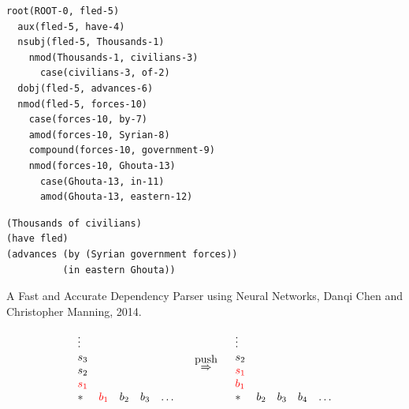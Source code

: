 {\begin{verbatim}
root(ROOT-0, fled-5)
  aux(fled-5, have-4)
  nsubj(fled-5, Thousands-1)
    nmod(Thousands-1, civilians-3)
      case(civilians-3, of-2)
  dobj(fled-5, advances-6)
  nmod(fled-5, forces-10)
    case(forces-10, by-7)
    amod(forces-10, Syrian-8)
    compound(forces-10, government-9)
    nmod(forces-10, Ghouta-13)
      case(Ghouta-13, in-11)
      amod(Ghouta-13, eastern-12)
\end{verbatim}


\begin{verbatim}
(Thousands of civilians)
(have fled)
(advances (by (Syrian government forces))
          (in eastern Ghouta))
\end{verbatim}



A Fast and Accurate Dependency Parser using Neural Networks,
Danqi Chen and Christopher Manning, 2014.

\vfill
$$\begin{array}{lllll}
  \vdots \\
  s_3 \\
    s_2 \\
    {\color{red} s_1} \\
    * & {\color{red} b_1} & b_2 & b_3 & \ldots
  \end{array}
  \;\;\;\;
  \stackrel{\mbox{push}}{\Rightarrow}
  \;\;\;
  \begin{array}{lllll}
    \vdots \\
    s_2 \\
    {\color{red} s_1} \\
    {\color{red} b_1} \\
    * & b_2 & b_3 & b_4 & \ldots
  \end{array}$$


}

